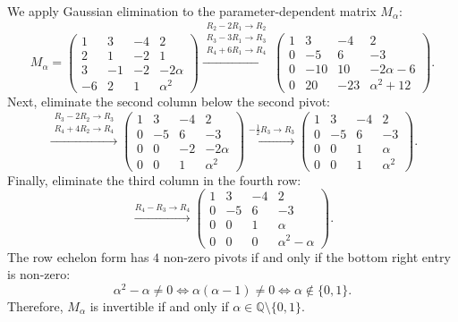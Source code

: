 \begin{exercisesolution*}
\label{sol:parametric_gaussian_elimination_invertibility}
We apply Gaussian elimination to the parameter-dependent matrix $M_\alpha$:
\[
M_\alpha = \begin{pmatrix}
1 & 3 & -4 & 2 \\
2 & 1 & -2 & 1 \\
3 & -1 & -2 & -2\alpha \\
-6 & 2 & 1 & \alpha^2
\end{pmatrix}
\xrightarrow{\substack{R_2 - 2R_1 \to R_2 \\ R_3 - 3R_1 \to R_3 \\ R_4 + 6R_1 \to R_4}}
\begin{pmatrix}
1 & 3 & -4 & 2 \\
0 & -5 & 6 & -3 \\
0 & -10 & 10 & -2\alpha - 6 \\
0 & 20 & -23 & \alpha^2 + 12
\end{pmatrix}.
\]
Next, eliminate the second column below the second pivot:
\[
\xrightarrow{\substack{R_3 - 2R_2 \to R_3 \\ R_4 + 4R_2 \to R_4}}
\begin{pmatrix}
1 & 3 & -4 & 2 \\
0 & -5 & 6 & -3 \\
0 & 0 & -2 & -2\alpha \\
0 & 0 & 1 & \alpha^2
\end{pmatrix}
\xrightarrow{-\frac{1}{2}R_3 \to R_3}
\begin{pmatrix}
1 & 3 & -4 & 2 \\
0 & -5 & 6 & -3 \\
0 & 0 & 1 & \alpha \\
0 & 0 & 1 & \alpha^2
\end{pmatrix}.
\]
Finally, eliminate the third column in the fourth row:
\[
\xrightarrow{R_4 - R_3 \to R_4}
\begin{pmatrix}
1 & 3 & -4 & 2 \\
0 & -5 & 6 & -3 \\
0 & 0 & 1 & \alpha \\
0 & 0 & 0 & \alpha^2 - \alpha
\end{pmatrix}.
\]
The row echelon form has $4$ non-zero pivots if and only if the bottom right entry is non-zero:
\[
\alpha^2 - \alpha \ne 0 \iff \alpha(\alpha - 1) \ne 0 \iff \alpha \notin \{0, 1\}.
\]
Therefore, $M_\alpha$ is invertible if and only if $\alpha \in \mathbb{Q} \setminus \{0, 1\}$.
\end{exercisesolution*}

